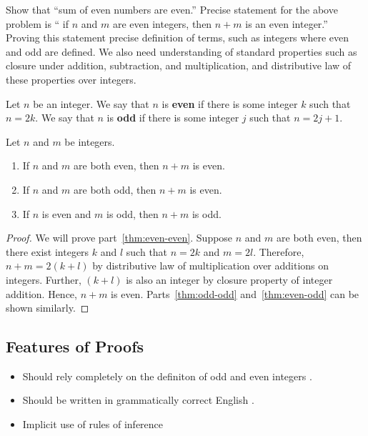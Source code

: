 \documentclass[a4paper,english,12pt]{article}
\begin{document}
\begin{exmp} Show that ``sum of even numbers are even.'' Precise statement for the above problem is `` if $n$ and $m$ are even integers, then $n+m$ is an even integer.''\\
Proving this statement precise definition of terms, such as integers where even and odd are defined. We also need understanding of standard properties such as closure under addition, subtraction, and multiplication, and distributive law of these properties over integers.
\end{exmp}
\begin{defn}Let $n$ be an integer. We say that $n$ is \textbf{even} if there is some integer $k$ such that $n=2k$. We say that $n$ is \textbf{odd} if there is some integer $j$ such that $n = 2j+1$.
\end{defn}
\begin{thm} Let $n$ and $m$ be integers.
\begin{enumerate}[i]
	\item \label{thm:even-even} If $n$ and $m$ are both even, then $n+m$ is even.
	\item \label{thm:odd-odd}If $n$ and $m$ are both odd, then $n+m$ is even.
	\item \label{thm:even-odd} If $n$ is even and $m$ is odd, then $n+m$ is odd.
\end{enumerate}
\end{thm}
\begin{proof}
We will prove part~\ref{thm:even-even}. Suppose $n$ and $m$ are both even, then there exist integers $k$ and $l$ such that $n=2k$ and $m=2l$. Therefore, $n+m=2(k+l)$ by distributive law of multiplication over additions on integers. Further, $(k+l)$ is also an integer by closure property of integer addition. Hence, $n+m$ is even. Parts~\ref{thm:odd-odd} and~\ref{thm:even-odd} can be shown similarly.
\end{proof}

\subsection{Features of Proofs}
\begin{itemize}
\item Should rely completely on the definiton of odd and even integers .
\item Should be written in grammatically correct English .
\item Implicit use of rules of inference
\end{itemize}
\end{document}
